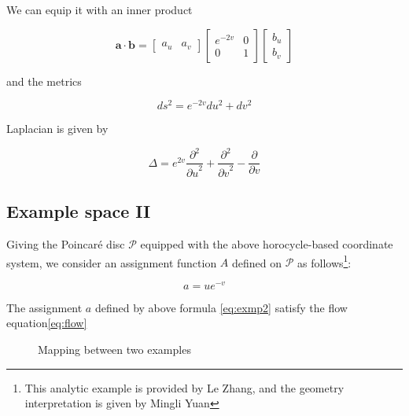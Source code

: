 We can equip it with an inner product

\[
\mathbf{a} \cdot \mathbf{b} = \begin{bmatrix} a_u & a_v \end{bmatrix} \begin{bmatrix} e^{-2v} & 0 \\ 0 & 1 \end{bmatrix} \begin{bmatrix} b_u \\ b_v \end{bmatrix}
\]

and the metrics

$$
ds^2 = e^{-2v} du^2 + dv^2
$$

Laplacian is given by\cite{Costa2001ADO}

$$
\Delta = e^{2v} \frac{\partial^2}{{\partial u}^2} + \frac{\partial^2}{{\partial v}^2} - \frac{\partial}{\partial v}
$$

\subsection{Example space II}\label{subsec:exmp2}

Giving the Poincaré disc $\mathcal{P}$ equipped with the above horocycle-based coordinate system,
we consider an assignment function $A$ defined on $\mathcal{P}$ as follows\footnote{This analytic example is provided by Le Zhang, and the geometry interpretation is given by Mingli Yuan}:

\begin{equation}\label{eq:exmp2}
a = u e^{-v}
\end{equation}

\begin{theorem}
The assignment $a$ defined by above formula \eqref{eq:exmp2} satisfy the flow equation\eqref{eq:flow}
\end{theorem}

\begin{figure}[ht]
\centering
{}
\caption{Mapping between two examples}\label{fig:mapping}
\end{figure}

